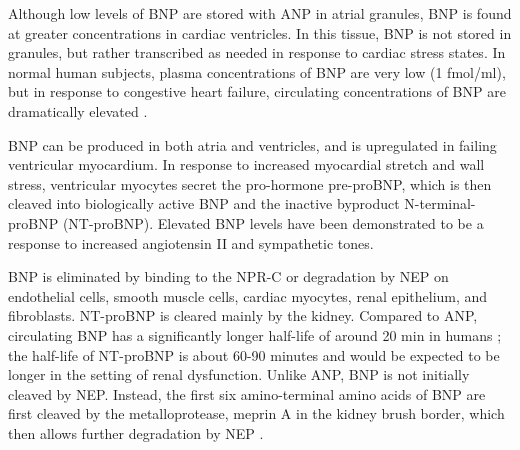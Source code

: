 \documentclass[14pt,a4paper,onecolumn]{extarticle}
\begin{document}

Although low levels of BNP are stored with ANP in atrial granules, BNP is found at greater concentrations in cardiac ventricles. In this tissue, BNP is not stored in granules, but rather transcribed as needed in response to cardiac stress states. \citep{Grepin1994} \citep{Thuerauf1994} In normal human subjects, plasma concentrations of BNP are very low (1 fmol/ml), but in response to congestive heart failure, circulating concentrations of BNP are dramatically elevated \citep{Mukoyama1991} \citep{Mukoyama1990}.

BNP can be produced in both atria and ventricles, and is upregulated in failing ventricular myocardium. In response to increased myocardial stretch and wall stress, ventricular myocytes secret the pro-hormone pre-proBNP, which is then cleaved into biologically active BNP and the inactive byproduct N-terminal-proBNP (NT-proBNP). Elevated BNP levels have been demonstrated to be a response to increased angiotensin II and sympathetic tones. \citep{Iwanaga2006}


BNP is eliminated by binding to the NPR-C or degradation by NEP on endothelial cells, smooth muscle cells, cardiac myocytes, renal epithelium, and fibroblasts. NT-proBNP is cleared mainly by the kidney.\citep{Schrier1999}  Compared to ANP, circulating BNP has a significantly longer half-life of around 20 min in humans \citep{Mukoyama1991} \citep{Mukoyama1990}; the half-life of NT-proBNP is about 60-90 minutes and would be expected to be longer in the setting of renal dysfunction. Unlike ANP, BNP is not initially cleaved by NEP. Instead, the first six amino-terminal amino acids of BNP are first cleaved by the metalloprotease, meprin A in the kidney brush border, which then allows further degradation by NEP \citep{Pankow2007}. %
\end{document}
